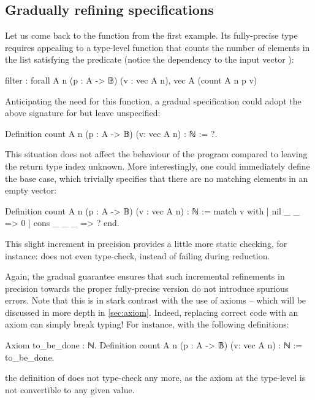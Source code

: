 \subsection{Gradually refining specifications}
\label{sec:specif}
  
Let us come back to the  function from the first example.
Its fully-precise type requires appealing to a type-level function that counts the number of
elements in the list satisfying the predicate
(notice the dependency to the input vector ):
\begin{coqcode}
  filter : forall A n (p : A -> 𝔹) (v : vec A n),
            vec A (count A n p v)
\end{coqcode}

Anticipating the need for this function, a gradual specification could adopt the above
signature for  but leave  unspecified:
\begin{coqcode}
Definition count A n (p : A -> 𝔹) (v: vec A n) : ℕ := ?.
\end{coqcode}

This situation does not affect the behaviour of the program compared to leaving the return type index unknown. More interestingly, one could immediately define the base case, which trivially specifies that there are no matching elements in an empty vector:
\begin{coqcode}
Definition count A n (p : A -> 𝔹) (v : vec A n) : ℕ :=
  match v with
  | nil _ _ => 0
  | cons _ _ _ => ?
  end.
\end{coqcode}

This slight increment in precision provides a little more static checking, for instance:
does not even type-check, instead of failing during reduction.

Again, the gradual guarantee ensures that such incremental refinements in precision towards the proper fully-precise version do not introduce spurious errors.
Note that this is in stark contrast with the use of axioms – which will be discussed in more depth in \cref{sec:axiom}. Indeed, replacing correct code with an axiom can simply break typing! For instance, with the following definitions:
\begin{coqcode}
Axiom to_be_done : ℕ.
Definition count A n (p : A -> 𝔹) (v: vec A n) : ℕ :=
  to_be_done.
\end{coqcode}
the definition of  does not type-check any more,
as the axiom at the type-level is not convertible to any given value.

